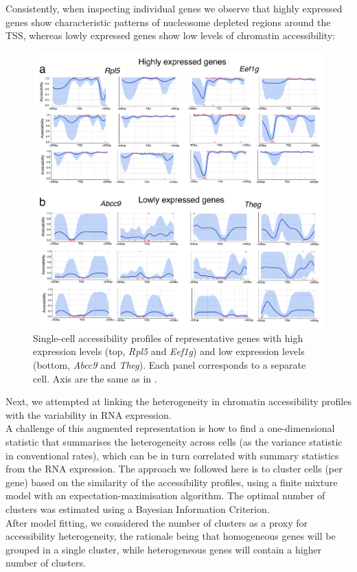 Consistently, when inspecting individual genes we observe that highly expressed genes show characteristic patterns of nucleosome depleted regions around the TSS, whereas lowly expressed genes show low levels of chromatin accessibility:

\begin{figure}[H]
	\centering
	\includegraphics[width=0.9\linewidth]{scNMT_profiles_expr}
	\caption[]{Single-cell accessibility profiles of representative genes with high expression levels (top, \textit{Rpl5} and \textit{Eef1g}) and low expression levels (bottom, \textit{Abcc9} and \textit{Theg}). Each panel corresponds to a separate cell. Axis are the same as in . }
	\label{fig:scnmt_profiles_highexpr}
\end{figure}

Next, we attempted at linking the heterogeneity in chromatin accessibility profiles with the variability in RNA expression.\\
A challenge of this augmented representation is how to find a one-dimensional statistic that summarises the heterogeneity across cells (as the variance statistic in conventional rates), which can be in turn correlated with summary statistics from the RNA expression. The approach we followed here is to cluster cells (per gene) based on the similarity of the accessibility profiles, using a finite mixture model with an expectation-maximisation algorithm. The optimal number of clusters was estimated using a Bayesian Information Criterion.\\
After model fitting, we considered the number of clusters as a proxy for accessibility heterogeneity, the rationale being that homogeneous genes will be grouped in a single cluster, while heterogeneous genes will contain a higher number of clusters.\\

